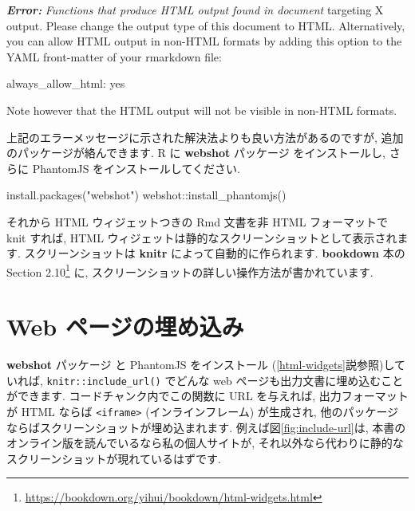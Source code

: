 \documentclass[
  11pt,
  lualatex,
  ja=standard]{bxjsreport}
\newenvironment{Shaded}{\begin{snugshade}}{\end{snugshade}}
\newcommand{\AnnotationTok}[1]{\textcolor[rgb]{0.56,0.35,0.01}{\textbf{\textit{#1}}}}
\newcommand{\CommentTok}[1]{\textcolor[rgb]{0.56,0.35,0.01}{\textit{#1}}}
\newcommand{\FunctionTok}[1]{\textcolor[rgb]{0.00,0.00,0.00}{#1}}
\newcommand{\NormalTok}[1]{#1}
\newcommand{\SpecialCharTok}[1]{\textcolor[rgb]{0.00,0.00,0.00}{#1}}
\newcommand{\StringTok}[1]{\textcolor[rgb]{0.31,0.60,0.02}{#1}}
\renewcommand{\href}[2]{#2\footnote{\url{#1}}}
\begin{document}
\begin{Shaded}
\begin{Highlighting}[]
\AnnotationTok{Error:}\CommentTok{ Functions that produce HTML output found in document}
\NormalTok{targeting X output. Please change the output type of this}
\NormalTok{document to HTML. Alternatively, you can allow HTML output in}
\NormalTok{non{-}HTML formats by adding this option to the YAML front{-}matter}
\NormalTok{of your rmarkdown file:}

\NormalTok{  always\_allow\_html: yes}

\NormalTok{Note however that the HTML output will not be visible in}
\NormalTok{non{-}HTML formats.}
\end{Highlighting}
\end{Shaded}

上記のエラーメッセージに示された解決法よりも良い方法があるのですが, 追加のパッケージが絡んできます. R に \textbf{webshot} パッケージ\autocite{R-webshot} をインストールし, さらに PhantomJS をインストールしてください.

\begin{Shaded}
\begin{Highlighting}[numbers=left,,]
\FunctionTok{install.packages}\NormalTok{(}\StringTok{"webshot"}\NormalTok{)}
\NormalTok{webshot}\SpecialCharTok{::}\FunctionTok{install\_phantomjs}\NormalTok{()}
\end{Highlighting}
\end{Shaded}

それから HTML ウィジェットつきの Rmd 文書を非 HTML フォーマットで knit すれば, HTML ウィジェットは静的なスクリーンショットとして表示されます. スクリーンショットは \textbf{knitr} によって自動的に作られます. \textbf{bookdown} 本の \href{https://bookdown.org/yihui/bookdown/html-widgets.html}{Section 2.10} に, スクリーンショットの詳しい操作方法が書かれています.

\hypertarget{include-url}{%
\section{Web ページの埋め込み}\label{include-url}}

\textbf{webshot} パッケージ \autocite{R-webshot} と PhantomJS をインストール (\ref{html-widgets}説参照)していれば, \texttt{knitr::include\_url()} でどんな web ページも出力文書に埋め込むことができます. コードチャンク内でこの関数に URL を与えれば, 出力フォーマットが HTML ならば \texttt{\textless{}iframe\textgreater{}} (インラインフレーム) が生成され, 他のパッケージならばスクリーンショットが埋め込まれます. 例えば図\ref{fig:include-url}は, 本書のオンライン版を読んでいるなら私の個人サイトが, それ以外なら代わりに静的なスクリーンショットが現れているはずです.
\end{document}
